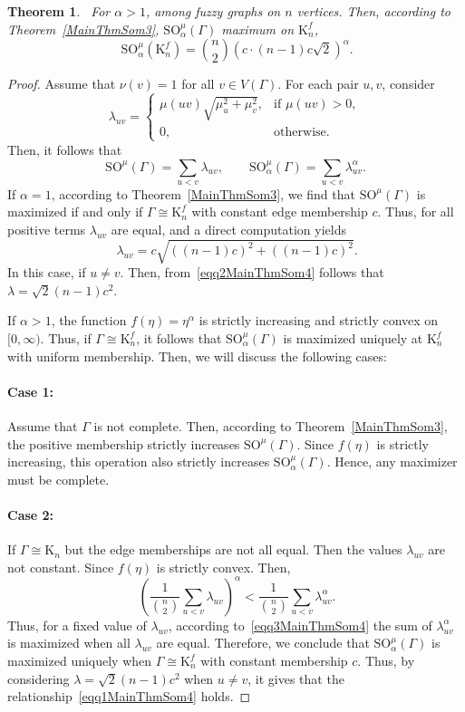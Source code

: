 \documentclass[12pt]{amsart}
\newcommand{\case}[1]{\paragraph*{Case #1:}}
\newtheorem{theorem}{Theorem}[section]
\newcommand{\SOG}{\mathrm{SO}^{\mu}}
\newcommand{\KK}{\mathrm{K}}
\begin{document}
\begin{theorem}~\label{MainThmSom4}
For $\alpha > 1$, among fuzzy graphs on $n$ vertices. Then, according to Theorem~\ref{MainThmSom3}, $\SOG_{\alpha}(\Gamma)$ maximum on $\KK_n^f$,
\begin{equation}~\label{eqq1MainThmSom4}
 \SOG_{\alpha}(\KK_n^f)=\binom{n}{2}\left(c \cdot (n-1)c \sqrt{2} \right)^{\alpha}.   
\end{equation}
\end{theorem}
\begin{proof}
Assume that $\nu(v)=1$ for all $v \in V(\Gamma)$. For each pair $u,v$, consider
\[
\lambda_{uv} =
\begin{cases}
\mu(uv)\sqrt{\mu_u^2 + \mu_v^2}, & \text{if } \mu(uv)>0,\\
0, & \text{otherwise}.
\end{cases}
\]
Then, it follows that 
\[
\SOG(\Gamma) = \sum_{u<v} \lambda_{uv}, \qquad
\SOG_{\alpha}(\Gamma) = \sum_{u<v} \lambda_{uv}^{\alpha}.
\]
If $\alpha=1$, according to Theorem~\ref{MainThmSom3}, we find that $\SOG(\Gamma)$ is maximized if and only if $\Gamma\cong \KK_n^f$ with constant edge membership $c$. Thus,  for all positive terms $\lambda_{uv}$ are equal, and a direct computation yields
\begin{equation}~\label{eqq2MainThmSom4}
\lambda_{uv} = c \sqrt{((n-1)c)^2 + ((n-1)c)^2}.
\end{equation}
In this case, if $u \neq v$. Then, from~\eqref{eqq2MainThmSom4} follows that $\lambda = \sqrt{2}(n-1)c^2$.

If $\alpha > 1$, the function $f(\eta)=\eta^{\alpha}$ is strictly increasing and strictly convex on $[0,\infty)$. Thus, if $\Gamma\cong \KK_n^f$, it follows that $\SOG_{\alpha}(\Gamma)$ is maximized uniquely at $\KK_n^f$ with uniform membership. Then, we will discuss the following cases:

\case{1} Assume that $\Gamma$ is not complete. Then, according to Theorem~\ref{MainThmSom3}, the positive membership strictly increases $\SOG(\Gamma)$. Since $f(\eta)$ is strictly increasing, this operation also strictly increases $\SOG_{\alpha}(\Gamma)$. Hence, any maximizer must be complete.

\case{2} If $\Gamma\cong \KK_n$ but the edge memberships are not all equal. Then the values $\lambda_{uv}$ are not constant. Since $f(\eta)$ is strictly convex. Then, 
\begin{equation}~\label{eqq3MainThmSom4}
\left( \frac{1}{\binom{n}{2}} \sum_{u<v} \lambda_{uv} \right)^{\alpha}<\frac{1}{\binom{n}{2}} \sum_{u<v} \lambda_{uv}^{\alpha}. 
\end{equation}
Thus, for a fixed value of $\lambda_{uv}$, according to~\eqref{eqq3MainThmSom4} the sum of $\lambda_{uv}^{\alpha}$ is maximized when all $\lambda_{uv}$ are equal.
Therefore, we conclude that $\SOG_{\alpha}(\Gamma)$ is maximized uniquely when $\Gamma\cong  \KK_n^f$ with constant membership $c$. Thus, by considering $\lambda=\sqrt{2}(n-1)c^2$ when $u\neq v$, it gives that the relationship~\eqref{eqq1MainThmSom4} holds.
\end{proof}
\end{document}
